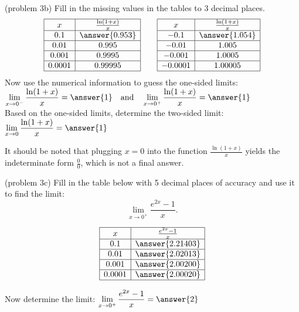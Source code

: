 \documentclass[handout]{ximera}
\begin{document}
\begin{problem}(problem 3b)
Fill in the missing values in the tables to 3 decimal places.
\[
\begin{array}{| c | c|}
	\hline
  x & \frac{\ln(1+x)}{x}\\ 
  \hline
  0.1 & \answer{0.953}  \\ 
  \hline
	  0.01 & 0.995  \\ 
	\hline
	  0.001 & 0.9995 \\ 
	\hline
	  0.0001 & 0.99995 \\
	  \hline
\end{array}
\qquad
\begin{array}{| c | c|}
	\hline
  x & \frac{\ln(1+x)}{x}\\ 
  \hline
  -0.1 & \answer{1.054} \\ 
  \hline
	 -0.01 & 1.005 \\ 
	\hline
	 -0.001 & 1.0005 \\ 
	\hline
	  -0.0001 & 1.00005\\
	  \hline
\end{array}
\]
Now use the numerical information to guess the one-sided limits:\\
$\displaystyle \lim_{x \to 0^-} \frac{\ln(1+x)}{x} = \answer{1} \quad \text{and} \quad \lim_{x \to 0^+} \frac{\ln(1+x)}{x} = \answer{1}$	\\

Based on the one-sided limits, determine the two-sided limit: $\displaystyle \lim_{x \to 0} \frac{\ln(1+x)}{x} = \answer{1}$

It should be noted that plugging $x=0$ into the 
function $\displaystyle{\frac{\ln(1+x)}{x}}$ yields the indeterminate form $\displaystyle\frac{0}{0}$, which is not a final answer.

\end{problem}


\begin{problem}(problem 3c)
Fill in the table below with 5 decimal places of accuracy and use it to find the limit:
\[\lim_{x \to 0^+} \frac{e^{2x} - 1}{x}.\]

\[
\begin{array}{| c | c |}
	\hline
  x & \frac{e^{2x} - 1}{x}  \\ 
	\hline 
	0.1 &  \answer{2.21403}\\
	\hline
	0.01 &  \answer{2.02013}\\
	\hline
	0.001 &  \answer{2.00200}\\
	\hline
	0.0001 &  \answer{2.00020}\\
	\hline
\end{array}
\]



Now determine the limit: $\displaystyle \lim_{x \to 0^+} \frac{e^{2x} - 1}{x} =\answer{2}	$

\end{problem}
\end{document}
